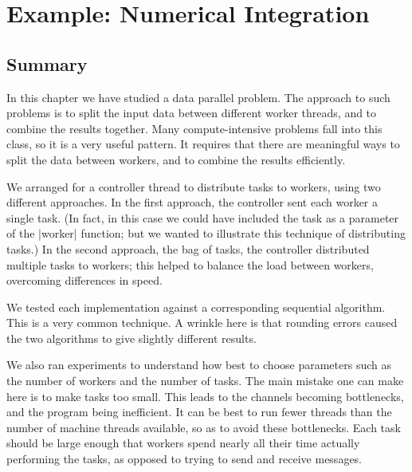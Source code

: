 \chapter{Example: Numerical Integration}
\label{chap:trapezium}



\section{Summary}

In this chapter we have studied a data parallel problem.  The approach to such
problems is to split the input data between different worker threads, and to
combine the results together.  Many compute-intensive problems fall into this
class, so it is a very useful pattern.  It  requires that there are
meaningful ways to split the data between workers, and to combine the results
efficiently.

We arranged for a controller thread to distribute tasks to workers, using two
different approaches.  In the first approach, the controller sent each worker
a single task.  (In fact, in this case we could have included the task as a
parameter of the |worker| function; but we wanted to illustrate this technique
of distributing tasks.)  In the second approach, the bag of tasks, the
controller distributed multiple tasks to workers; this helped to balance the
load between workers, overcoming differences in speed.

We tested each implementation against a corresponding sequential algorithm.
This is a very common technique.  A wrinkle here is that rounding errors
caused the two algorithms to give slightly different results.  

We also ran experiments to understand how best to choose parameters such as
the number of workers and the number of tasks.  The main mistake one can make
here is to make tasks  too small.  This leads to the channels becoming
bottlenecks, and the program being inefficient.  It can be best to run fewer
threads than the number of machine threads available, so as to avoid these
bottlenecks.  Each task should be large enough that workers spend nearly all
their time actually performing the tasks, as opposed to trying to send and
receive messages.

